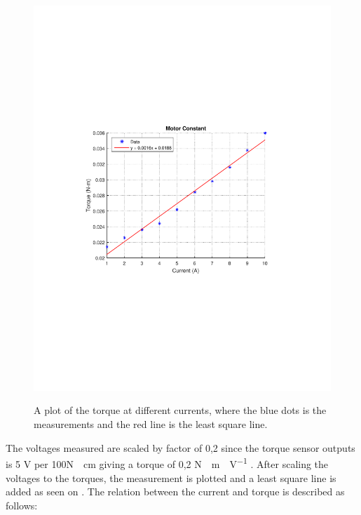 \begin{minipage}{\linewidth}
\begin{minipage}{0.6\linewidth}
\begin{figure}[H]
{    \includegraphics[width=1.5\textwidth]{figures/motorConstant.pdf}
  }
	\caption{A plot of the torque at different currents, where the blue dots is the measurements and the red line is the least square line.}
	\label{motorConstant}
\end{figure}\vspace{-5mm}
	\end{minipage}
\end{minipage}






The voltages measured are scaled by factor of 0,2 since the torque sensor outputs is 5 V per \si{100N\cdot cm} giving a torque of 0,2 \si{N\cdot m \cdot V^{-1}} \cite{MWAW81P}.
After scaling the voltages to the torques, the measurement is plotted and a least square line is added as seen on . The relation between the current and torque is described as follows:

